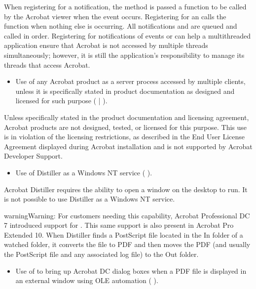 \documentclass[letterpaper,12pt,english,openany,oneside]{sphinxmanual}
\begin{document}
When registering for a notification, the method is passed a function to be called by the Acrobat viewer when the event occurs. Registering for an  calls the function when nothing else is occurring. All notifications and  are queued and called in order. Registering for notifications of events or  can help a multithreaded application ensure that Acrobat is not accessed by multiple threads simultaneously; however, it is still the application’s responsibility to manage its threads that access Acrobat.
\begin{itemize}
\item {} 
Use of any Acrobat product as a server process accessed by multiple clients, unless it is specifically stated in product documentation as designed and licensed for such purpose (  |  ).

\end{itemize}

Unless specifically stated in the product documentation and licensing agreement, Acrobat products are not designed, tested, or licensed for this purpose. This use is in violation of the licensing restrictions, as described in the End User License Agreement displayed during Acrobat installation and is not supported by Acrobat Developer Support.
\begin{itemize}
\item {} 
Use of Distiller as a Windows NT service (  ).

\end{itemize}

Acrobat Distiller requires the ability to open a window on the desktop to run. It is not possible to use Distiller as a Windows NT service.

\begin{sphinxadmonition}{warning}{Warning:}
For customers needing this capability, Acrobat Professional DC 7 introduced support for  . This same support is also present in Acrobat Pro Extended 10. When Distiller finds a PostScript file located in the In folder of a watched folder, it converts the file to PDF and then moves the PDF (and usually the PostScript file and any associated log file) to the Out folder.
\end{sphinxadmonition}
\begin{itemize}
\item {} 
Use of  to bring up Acrobat DC dialog boxes when a PDF file is displayed in an external window using OLE automation (  ).

\end{itemize}
\end{document}
